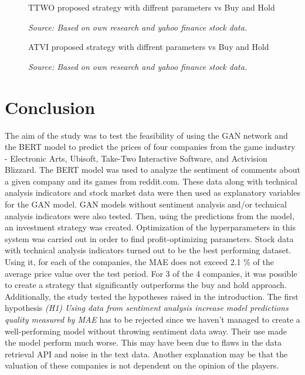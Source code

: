 \documentclass[11pt]{article} %
\begin{document}
\begin{figure}[H]
\caption{TTWO proposed strategy with diffrent parameters vs Buy and Hold}
\begin{adjustbox}{width=1.3\textwidth,center}

\end{adjustbox}
\caption*{\textit{Source: Based on own research and yahoo finance stock data.}}
\end{figure}

\begin{figure}[H]
\caption{ATVI proposed strategy with diffrent parameters vs Buy and Hold}
\begin{adjustbox}{width=1.3\textwidth,center}

\end{adjustbox}
\caption*{\textit{Source: Based on own research and yahoo finance stock data.}}
\end{figure}



\section{Conclusion}

The aim of the study was to test the feasibility of using the GAN network and the BERT model to predict the prices of four companies from the game industry -  Electronic Arts, Ubisoft, Take-Two Interactive Software, and Activision Blizzard. The BERT model was used to analyze the sentiment of comments about a given company and its games from reddit.com. These data along with technical analysis indicators and stock market data were then used as explanatory variables for the GAN model. GAN models without sentiment analysis and/or technical analysis indicators were also tested. Then, using the predictions from the model, an investment strategy was created. Optimization of the hyperparameters in this system was carried out in order to find profit-optimizing parameters. Stock data with technical analysis indicators turned out to be the best performing dataset. Using it, for each of the companies, the MAE does not exceed 2.1 \% of the average price value over the test period. For 3 of the 4 companies, it was possible to create a strategy that significantly outperforms the buy and hold approach. \\

Additionally, the study tested the hypotheses raised in the introduction. The first hypothesis \textit{(H1) Using data from sentiment analysis increase model predictions quality measured by MAE} has to be rejected since we haven't managed to create a well-performing model without throwing sentiment data away. Their use made the model perform much worse. This may have been due to flaws in the data retrieval API and noise in the text data. Another explanation may be that the valuation of these companies is not dependent on the opinion of the players. \\
\end{document}
